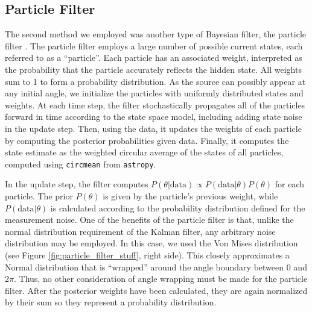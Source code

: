 \documentclass[11pt]{amsart}
\begin{document}
\subsection{Particle Filter}
The second method we employed was another type of Bayesian filter, the particle filter \cite{Particle}. The particle filter employs a large number of possible current states, each referred to 
as a “particle”. Each particle has an associated weight, interpreted as the probability that the particle accurately reflects the hidden state. All weights sum to 1 to form a probability distribution. As the source can possibly 
appear at any initial angle, we initialize the particles with uniformly distributed states and weights. At each time step, the filter stochastically propagates all of the particles forward in time according to the state space 
model, including adding state noise in the update step. Then, using the data, it updates the weights of each particle by computing the posterior probabilities given data. Finally, it computes the state estimate 
as the weighted circular average of the states of all particles, computed using \lstinline{circmean} from \lstinline{astropy}. 

In the update step, the filter computes $P(\theta|\text{data}) \propto P(\text{data}|\theta)P(\theta)$ for each particle. The prior $P(\theta)$ is given by the particle’s previous weight, while $P(\text{data}|\theta)$ is calculated 
according to the probability distribution defined for the measurement noise. One of the benefits of the particle filter is that, unlike the normal distribution requirement of the Kalman filter, any arbitrary noise 
distribution may be employed. In this case, we used the Von Mises distribution (see Figure \ref{fig:particle_filter_stuff}, right side). This closely approximates a Normal distribution 
that is “wrapped” around the angle boundary between $0$ and $2\pi$. Thus, no other consideration of angle wrapping must be made for the particle filter. After the posterior weights have been calculated, they are again normalized by 
their sum so they represent a probability distribution.
\end{document}
